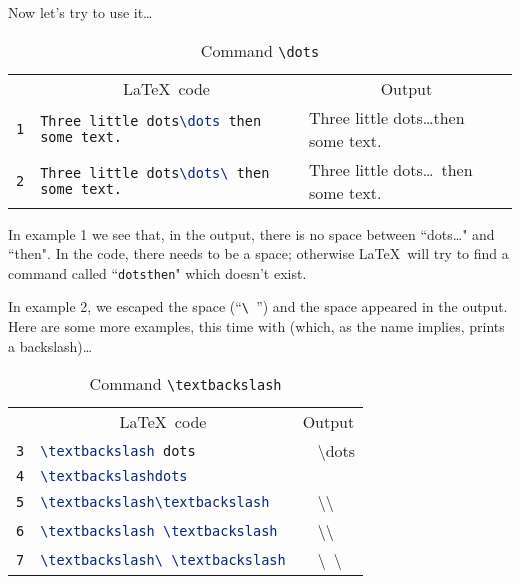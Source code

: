 Now let's try to use it\dots
\begin{table}[h]
	\centering
	\caption{Command \texttt{\textbackslash dots}}
	\medskip

	\begin{tabular}{c l l}
		& \multicolumn{1}{c}{\LaTeX\ code} & \multicolumn{1}{c}{Output} \\
		\texttt{1} &
		\lstinline[language=tex]|Three little dots\dots then some text.| 
		                       & Three little dots\dots then some text. \\
	    \texttt{2} &
	    \lstinline[language=tex]|Three little dots\dots\ then some text.| 
	                           & Three little dots\dots\ then some text. \\
	\end{tabular}
\end{table}


In example 1 we see that, in the output, there is no space between ``dots\dots" and ``then". In the code, there needs to be a space; otherwise \LaTeX\ will try to find a command called ``\texttt{dotsthen}" which doesn't exist.

In example 2, we escaped the space (``\texttt{\textbackslash\ }'') and the space appeared in the output. \\

Here are some more examples, this time with  (which, as the name implies, prints a backslash)\dots

\newpage

\begin{table}[h]
	\centering
	\caption{Command \texttt{\textbackslash textbackslash}}
	\medskip
	
	\begin{tabular}{c l c l}
		& \multicolumn{1}{c}{\LaTeX\ code} & \multicolumn{2}{c}{Output} \\
		\texttt{3} &
		\lstinline[language=tex]|\textbackslash dots| 
		                     & & \textbackslash dots \\
		\texttt{4} &
		\lstinline[language=tex]|\textbackslashdots| 
		& &  \\

		\texttt{5} &
		\lstinline[language=tex]|\textbackslash\textbackslash| 
		                     & & \textbackslash\textbackslash \\
		\texttt{6} &
		\lstinline[language=tex]|\textbackslash \textbackslash| 
		                     & & \textbackslash \textbackslash \\
		\texttt{7} &
		\lstinline[language=tex]|\textbackslash\ \textbackslash| 
		                     & & \textbackslash\ \textbackslash \\
	\end{tabular}
\end{table}

